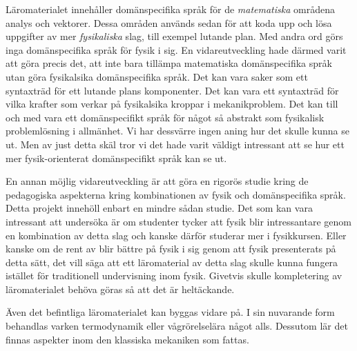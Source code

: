 \begin{draft}
Läromaterialet innehåller domänspecifika språk för de \textit{matematiska}
områdena analys och vektorer. Dessa områden används sedan för att koda upp och
lösa uppgifter av mer \textit{fysikaliska} slag, till exempel lutande plan. Med
andra ord görs inga domänspecifika språk för fysik i sig. En vidareutveckling
hade därmed varit att göra precis det, att inte bara tillämpa matematiska
domänspecifika språk utan göra fysikalsika domänspecifika språk. Det kan vara
saker som ett syntaxträd för ett lutande plans komponenter. Det kan vara ett
syntaxträd för vilka krafter som verkar på fysikalsika kroppar i mekanikproblem.
Det kan till och med vara ett domänspecifikt språk för något så abstrakt som
fysikalisk problemlösning i allmänhet. Vi har dessvärre ingen aning hur det
skulle kunna se ut. Men av just detta skäl tror vi det hade varit väldigt
intressant att se hur ett mer fysik-orienterat domänspecifikt språk kan se ut.

En annan möjlig vidareutveckling är att göra en rigorös studie kring de
pedagogiska aspekterna kring kombinationen av fysik och domänspecifika språk.
Detta projekt innehöll enbart en mindre sådan studie. Det som kan vara
intressant att undersöka är om studenter tycker att fysik blir intressantare
genom en kombination av detta slag och kanske därför studerar mer i fysikkursen.
Eller kanske om de rent av blir bättre på fysik i sig genom att fysik
presenterats på detta sätt, det vill säga att ett läromaterial av detta slag
skulle kunna fungera istället för traditionell undervisning inom fysik. Givetvis
skulle kompletering av läromaterialet behöva göras så att det är heltäckande.

Även det befintliga läromaterialet kan byggas vidare på. I sin nuvarande
form behandlas varken termodynamik eller vågrörelselära något alls. Dessutom lär
det finnas aspekter inom den klassiska mekaniken som fattas.

\end{draft}
